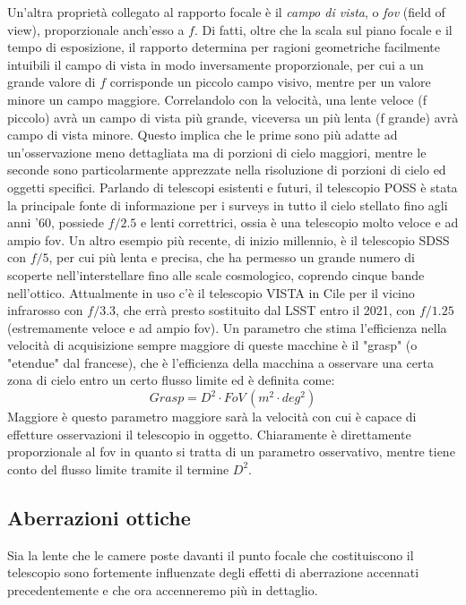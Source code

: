 \documentclass[a4paper,twoside,openany,notitlepage]{book}
\theoremstyle{definition}
\theoremstyle{plain}
\begin{document}
Un'altra proprietà collegato al rapporto focale è il \textit{campo di vista}, o \textit{fov} (field of view), proporzionale anch'esso a $f$. Di fatti, oltre che la scala sul piano focale e il tempo di esposizione, il rapporto determina per ragioni geometriche facilmente intuibili il campo di vista in modo inversamente proporzionale, per cui a un grande valore di $f$ corrisponde un piccolo campo visivo, mentre per un valore minore un campo maggiore. Correlandolo con la velocità, una lente veloce (f piccolo) avrà un campo di vista più grande, viceversa un più lenta (f grande) avrà campo di vista minore. Questo implica che le prime sono più adatte ad un'osservazione meno dettagliata ma di porzioni di cielo maggiori, mentre le seconde sono particolarmente apprezzate nella risoluzione di porzioni di cielo ed oggetti specifici. Parlando di telescopi esistenti e futuri, il telescopio POSS è stata la principale fonte di informazione per i surveys in tutto il cielo stellato fino agli anni '60, possiede $f/2.5$ e lenti correttrici, ossia è una telescopio molto veloce e ad ampio fov. Un altro esempio più recente, di inizio millennio, è il telescopio SDSS con $f/5$, per cui più lenta e precisa, che ha permesso un grande numero di scoperte nell'interstellare fino alle scale cosmologico, coprendo cinque bande nell'ottico. Attualmente in uso c'è il telescopio VISTA in Cile per il vicino infrarosso con $f/3.3$, che errà presto sostituito dal LSST entro il 2021, con $f/1.25$ (estremamente veloce e ad ampio fov). Un parametro che stima l'efficienza nella velocità di acquisizione sempre maggiore di queste macchine è il "grasp" (o "etendue" dal francese), che è l'efficienza della macchina a osservare una certa zona di cielo entro un certo flusso limite ed è definita come:
\begin{equation*}
	Grasp = D^2 \cdot FoV \, (m^2 \cdot deg^2)
\end{equation*}
Maggiore è questo parametro maggiore sarà la velocità con cui è capace di effetture osservazioni il telescopio in oggetto. Chiaramente è direttamente proporzionale al fov in quanto si tratta di un parametro osservativo, mentre tiene conto del flusso limite tramite il termine $D^2$.

\subsection*{Aberrazioni ottiche}

Sia la lente che le camere poste davanti il punto focale che costituiscono il telescopio sono fortemente influenzate degli effetti di aberrazione accennati precedentemente e che ora accenneremo più in dettaglio.
\end{document}
